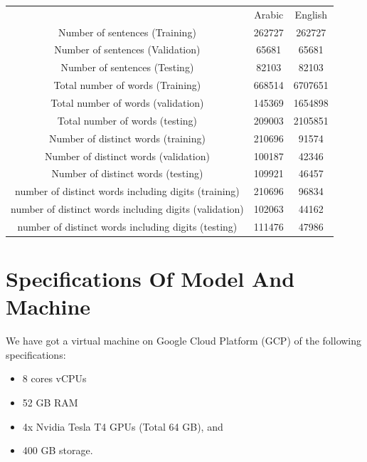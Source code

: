 \documentclass{report}
\begin{document}
\begin{center}
	\begin{tabular}{ |c|c|c| }
		\hline
 & Arabic & English \\
Number of sentences (Training) & 262727 & 262727 \\
Number of sentences (Validation) & 65681 & 65681 \\
Number of sentences (Testing) & 82103 & 82103 \\
Total number of words (Training) & 668514 & 6707651 \\
Total number of words (validation) & 145369 & 1654898 \\
Total number of words (testing) & 209003 & 2105851 \\
Number of distinct words (training) & 210696 & 91574\\
Number of distinct words (validation) & 100187 & 42346 \\
Number of distinct words (testing) & 109921 & 46457 \\
number of distinct words including digits (training) & 210696 & 96834 \\
number of distinct words including digits (validation) & 102063 & 44162 \\
number of distinct words including digits (testing) & 111476 & 47986 \\
		\hline
	\end{tabular}
\end{center}

\section{Specifications Of Model And Machine}
\label{sec:our-model-specs}
We have got a virtual machine on Google Cloud Platform (GCP) of the following specifications:
\begin{itemize}
	\item 8 cores vCPUs
	\item 52 GB RAM
	\item 4x Nvidia Tesla T4 GPUs (Total 64 GB), and
	\item 400 GB storage.
\end{itemize}
\end{document}
